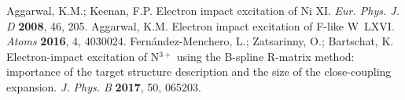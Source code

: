 \documentclass[fleqn]{article}
\begin{document}
\begin{thebibliography}{999}
 Aggarwal, K.M.;  Keenan, F.P.  Electron impact excitation of Ni XI.  {\em Eur. Phys. J. D}  {\bf 2008},   46, 205.
 Aggarwal, K.M. Electron impact excitation of F-like W~LXVI. {\em Atoms} {\bf 2016}, 4, 4030024. 
 Fern{\'a}ndez-Menchero, L.; Zatsarinny, O.; Bartschat, K. Electron-impact excitation of N$^{3+}$ using the B-spline R-matrix method: importance of the target structure description and the size of the close-coupling expansion.  {\em J. Phys. B} {\bf 2017}, 50, 065203.

\end{thebibliography}
\end{document}
